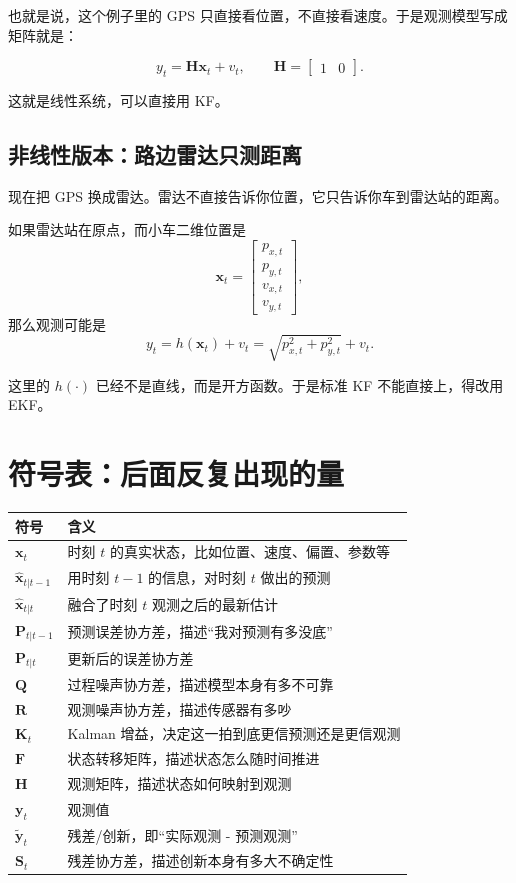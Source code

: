 \documentclass[12pt,a4paper]{ctexart}
\begin{document}
也就是说，这个例子里的 GPS 只直接看位置，不直接看速度。于是观测模型写成矩阵就是：

\[
y_t = \bm{H}\bm{x}_t + v_t,
\qquad
\bm{H}=
\begin{bmatrix}
1 & 0
\end{bmatrix}.
\]

这就是线性系统，可以直接用 KF。

\subsection{非线性版本：路边雷达只测距离}

现在把 GPS 换成雷达。雷达不直接告诉你位置，它只告诉你车到雷达站的距离。

如果雷达站在原点，而小车二维位置是
\[
\bm{x}_t=
\begin{bmatrix}
p_{x,t}\\
p_{y,t}\\
v_{x,t}\\
v_{y,t}
\end{bmatrix},
\]
那么观测可能是
\[
y_t = h(\bm{x}_t) + v_t
= \sqrt{p_{x,t}^2 + p_{y,t}^2} + v_t.
\]

这里的 \(h(\cdot)\) 已经不是直线，而是开方函数。于是标准 KF 不能直接上，得改用 EKF。

\section{符号表：后面反复出现的量}

\begin{longtable}{>{\raggedright\arraybackslash}p{2.4cm} >{\raggedright\arraybackslash}p{10.5cm}}
\toprule
符号 & 含义 \\
\midrule
\endhead
\(\bm{x}_t\) & 时刻 \(t\) 的真实状态，比如位置、速度、偏置、参数等 \\
\(\hat{\bm{x}}_{t|t-1}\) & 用时刻 \(t-1\) 的信息，对时刻 \(t\) 做出的预测 \\
\(\hat{\bm{x}}_{t|t}\) & 融合了时刻 \(t\) 观测之后的最新估计 \\
\(\bm{P}_{t|t-1}\) & 预测误差协方差，描述“我对预测有多没底” \\
\(\bm{P}_{t|t}\) & 更新后的误差协方差 \\
\(\bm{Q}\) & 过程噪声协方差，描述模型本身有多不可靠 \\
\(\bm{R}\) & 观测噪声协方差，描述传感器有多吵 \\
\(\bm{K}_t\) & Kalman 增益，决定这一拍到底更信预测还是更信观测 \\
\(\bm{F}\) & 状态转移矩阵，描述状态怎么随时间推进 \\
\(\bm{H}\) & 观测矩阵，描述状态如何映射到观测 \\
\(\bm{y}_t\) & 观测值 \\
\(\tilde{\bm{y}}_t\) & 残差/创新，即“实际观测 - 预测观测” \\
\(\bm{S}_t\) & 残差协方差，描述创新本身有多大不确定性 \\
\bottomrule
\end{longtable}
\end{document}
